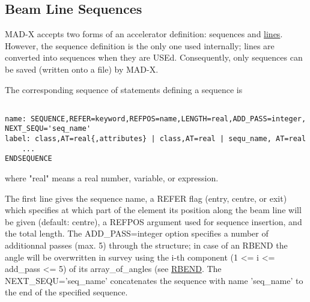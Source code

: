 




\subsection{Beam Line Sequences}
 MAD-X accepts two forms of an accelerator definition: sequences and \href{line.html}{lines}. However, the sequence definition is the only one used internally; lines are converted into sequences when they are USEd. Consequently, only sequences can be saved (written onto a file) by MAD-X. 

 The corresponding sequence of statements defining a sequence is 
\begin{verbatim}

name: SEQUENCE,REFER=keyword,REFPOS=name,LENGTH=real,ADD_PASS=integer,
NEXT_SEQU='seq_name'
label: class,AT=real{,attributes} | class,AT=real | sequ_name, AT=real
    ...
ENDSEQUENCE
\end{verbatim} where "real" means a real number, variable, or expression. 

 The first line gives the sequence name, a REFER flag (entry, centre, or exit) which specifies at which part of the element its position along the beam line will be given (default: centre), a REFPOS argument used for sequence insertion, and the total length. The ADD\_PASS=integer option specifies a number of additionnal passes (max. 5) through the structure; in case of an RBEND the angle will be overwritten in  survey using the i-th component (1 \textless = i \textless = add\_pass \textless= 5) of its array\_of\_angles (see \href{bend.html}{RBEND}. The NEXT\_SEQU='seq\_name' concatenates the sequence with name 'seq\_name'  to the end of the specified sequence.
 
